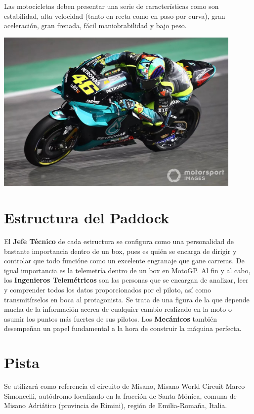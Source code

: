 \documentclass[12pt, letterpaper,spanish]{article}
\theoremstyle{definition}
\theoremstyle{remark}
\begin{document}
	Las motocicletas deben presentar una serie de características como son estabilidad, alta velocidad (tanto en recta como en paso por curva), gran aceleración, gran frenada, fácil maniobrabilidad y bajo peso.
	
	\begin{center}
		\includegraphics[width = 12cm]{imagen1} 
	\end{center}	
	
\section{Estructura del Paddock}
	El \textbf{Jefe Técnico} de cada estructura se configura como una personalidad de bastante importancia dentro de un box, pues es quién se encarga de dirigir y controlar que todo funcióne como un excelente engranaje que gane carreras. De igual importancia es la telemetría dentro de un box en MotoGP. Al fin y al cabo, los \textbf{Ingenieros Telemétricos} son las personas que se encargan de analizar, leer y comprender todos los datos proporcionados por el piloto, así como transmitírselos en boca al protagonista. Se trata de una figura de la que depende mucha de la información acerca de cualquier cambio realizado en la moto o asumir los puntos más fuertes de sus pilotos. Los \textbf{Mecánicos} también desempeñan un papel fundamental a la hora de construir la máquina perfecta.

\section{Pista}
	Se utilizará como referencia el circuito de Misano, Misano World Circuit Marco Simoncelli, autódromo localizado en la fracción de Santa Mónica, comuna de Misano Adriático (provincia de Rímini), región de Emilia-Romaña, Italia. 
	
\end{document}
